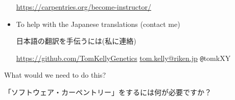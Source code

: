 \documentclass{beamer}
\begin{document}
\begin{frame}
\begin{itemize}
   \url{https://carpentries.org/become-instructor/}
      \smallskip
   
   \item To help with the Japanese translations (contact me) \\ \begin{CJK}{UTF8}{min}日本語の翻訳を手伝うには(私に連絡)\end{CJK}
   
   \url{https://github.com/TomKellyGenetics} \url{tom.kelly@riken.jp} \texttt{@}tomkXY
   
  \end{itemize}
  
  \end{frame}

  \begin{frame}
   
   \begin{center}
   
   \LARGE{What would we need to do this?}\\
   \LARGE{\begin{CJK}{UTF8}{min}「ソフトウェア・カーペントリー」をするには何が必要ですか？\end{CJK}}
   
   
   \begin{center}
  \end{center}
   \end{center}

  \end{frame}
  
\end{document}
